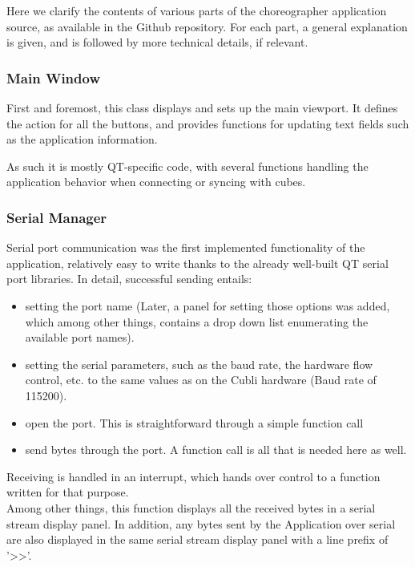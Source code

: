 Here we clarify the contents of various parts of the choreographer application source, as available in the Github repository. For each part, a general explanation is given, and is followed by more technical details, if relevant.

\subsubsection{Main Window}

First and foremost, this class displays and sets up the main viewport. It defines the action for all the buttons, and provides functions for updating text fields such as the application information.

As such it is mostly QT-specific code, with several functions handling the application behavior when connecting or syncing with cubes.

\subsubsection{Serial Manager}

Serial port communication was the first implemented functionality of the application, relatively easy to write thanks to the already well-built QT serial port libraries. In detail, successful sending entails: 

\begin{itemize}
\item setting the port name (Later, a panel for setting those options was added, which among other things, contains a drop down list enumerating the available port names).
\item setting the serial parameters, such as the baud rate, the hardware flow control, etc. to the same values as on the Cubli hardware (Baud rate of 115200).
\item open the port. This is straightforward through a simple function call 
\item send bytes through the port. A function call is all that is needed here as well. 
\end{itemize}

Receiving is handled in an interrupt, which hands over control to a function written for that purpose.\\

Among other things, this function displays all the received bytes in a serial stream display panel. In addition, any bytes sent by the Application over serial are also displayed in the same serial stream display panel with a line prefix of '>>'. \\

